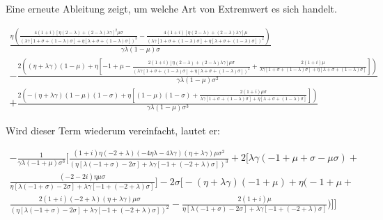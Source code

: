 Eine erneute Ableitung zeigt, um welche Art von Extremwert es sich handelt.


\begin{equation}
\begin{split}
\frac{\eta\left(\frac{4 (1+ i)[\eta(2- \lambda)+ (2- \lambda) \lambda \gamma]^{2} \mu \sigma}{\left(\lambda \gamma[1 + \sigma + (1 - \lambda) \sigma] + \eta [\lambda + \sigma + (1- \lambda)\sigma]\right)^{3}}- \frac{4(1+i)[\eta ( 2- \lambda)+ (2- \lambda) \lambda \gamma] \mu}{\left(\lambda \gamma [1+ \sigma + (1- \lambda) \sigma] + \eta [\lambda + \sigma + (1- \lambda) \sigma]\right)^{2}}\right)}{\gamma \lambda (1- \mu) \sigma}\\
-\frac{2\left((\eta +\lambda\gamma)(1-\mu)+\eta\left[-1+\mu-\frac{2(1+i) [\eta (2- \lambda)+(2-\lambda)\lambda \gamma]\mu\sigma}{\left(\lambda \gamma [1+\sigma+(1-\lambda)\sigma] +\eta[\lambda+\sigma +(1-\lambda)\sigma]\right)^{2}}+\frac{2(1+i)\mu}{\lambda\gamma[1+\sigma+(1-\lambda)\sigma]+\eta[\lambda+\sigma+(1-\lambda)\sigma]}\right]\right)}{\gamma\lambda(1-\mu)\sigma^{2}}\\
+\frac{2\left(-(\eta+\lambda \gamma)(1- \mu)(1- \sigma) +\eta\left[(1-\mu)(1-\sigma)+\frac{2 (1+i)\mu\sigma}{\lambda \gamma[1+\sigma + (1-\lambda)\sigma] +\eta[\lambda+\sigma+(1- \lambda)\sigma]}\right]\right)}{\gamma\lambda(1-\mu)\sigma^3}
\end{split}
\end{equation}


Wird dieser Term wiederum vereinfacht, lautet er: 


\begin{equation}
\begin{split}
\left.-\frac{1}{\gamma \lambda (-1 + \mu) \sigma ^{3}}\Bigg[\frac{(1+i) \eta (-2 + \lambda)(-4\eta \lambda - 4\lambda \gamma)(\eta+\lambda \gamma)\mu\sigma^{2}}{\left(\eta [\lambda (-1+ \sigma) -2\sigma]+\lambda\gamma[-1 +(-2+\lambda)\sigma]\right)^{3}}
+2\Big[\lambda \gamma(-1 + \mu +\sigma-\mu\sigma)+\right.\\ 
\left.\frac{(-2-2i)\eta\mu\sigma}{\eta[\lambda(-1+\sigma)-2 \sigma] + \lambda\gamma[-1+(-2+\lambda)\sigma]}\Big]-2\sigma\bigg[-( \eta + \lambda \gamma)(-1 + \mu) + \eta\Big(-1 +\mu+\right.\\
\left. \frac{2(1+i)(-2+ \lambda)(\eta + \lambda \gamma) \mu \sigma}{\left(\eta[\lambda (-1+ \sigma) -2\sigma] + \lambda \gamma[-1+(-2+\lambda)\sigma]\right)^2}-\frac{2 (1+ i)\mu}{\eta [\lambda (-1+\sigma)-2\sigma] + \lambda \gamma [-1 + (-2 + \lambda) \sigma]} \Big)\bigg]\Bigg]\right.
\end{split}
\end{equation}


